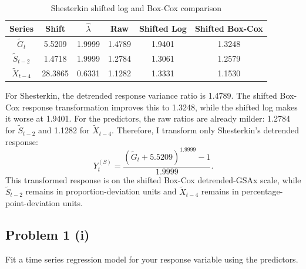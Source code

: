 \documentclass[
  10pt,
]{extarticle}
\begin{document}
\begin{center}
\scriptsize
\begin{table}[H]

\caption{\label{tab:p1-shesterkin-transform-table}Shesterkin shifted log and Box-Cox comparison}
\centering
\begin{tabular}[t]{cccccc}
\toprule
Series & Shift & $\hat{\lambda}$ & Raw & Shifted Log & Shifted Box-Cox\\
\midrule
$\tilde{G}_t$ & 5.5209 & 1.9999 & 1.4789 & 1.9401 & 1.3248\\
$\tilde{S}_{t-2}$ & 1.4718 & 1.9999 & 1.2784 & 1.3061 & 1.2579\\
$\tilde{X}_{t-4}$ & 28.3865 & 0.6331 & 1.1282 & 1.3331 & 1.1530\\
\bottomrule
\end{tabular}
\end{table}
\normalsize
\end{center}

For Shesterkin, the detrended response variance ratio is 1.4789. The shifted Box-Cox response transformation improves this to 1.3248, while the shifted log makes it worse at 1.9401. For the predictors, the raw ratios are already milder: 1.2784 for \(\tilde{S}_{t-2}\) and 1.1282 for \(\tilde{X}_{t-4}\). Therefore, I transform only Shesterkin's detrended response:
\[
Y^{(S)}_t
= \frac{\left(\tilde{G}_t + 5.5209\right)^{1.9999} - 1}{1.9999}.
\]
This transformed response is on the shifted Box-Cox detrended-GSAx scale, while \(\tilde{S}_{t-2}\) remains in proportion-deviation units and \(\tilde{X}_{t-4}\) remains in percentage-point-deviation units.

\newpage

\subsection{Problem 1 (i)}\label{problem-1-i}

\begin{problem}[Problem 1 (i)]
Fit a time series regression model for your response variable using the predictors.
\end{problem}
\end{document}
